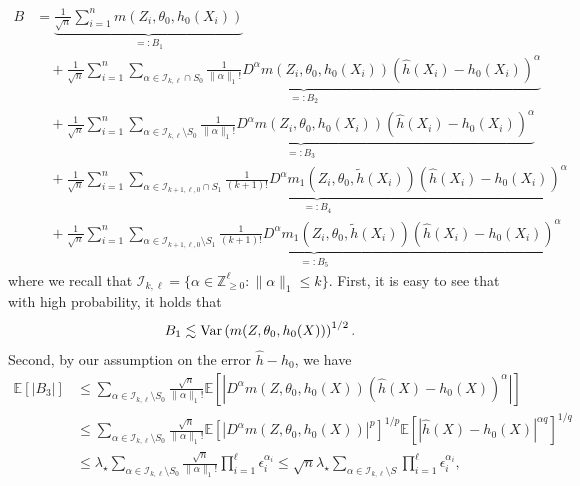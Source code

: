 \documentclass{article}
\def\eps{{\epsilon}}
\def\gI{{\mathcal{I}}}
\begin{document}
\begin{equation}
\label{eq:error-decomposition}
\begin{aligned}
B &=\underbrace{\frac{1}{\sqrt{n}} \sum_{i=1}^n m\left(Z_i, \theta_0, h_0\left(X_i\right)\right)}_{=:B_1}  \\
&\quad +\underbrace{\frac{1}{\sqrt{n}} \sum_{i=1}^n \sum_{\alpha \in \gI_{k,\ell} \cap S_0} \frac{1}{\|\alpha\|_{1}!} D^\alpha m\left(Z_i, \theta_0, h_0\left(X_i\right)\right)\left(\hat{h}\left(X_i\right)-h_0\left(X_i\right)\right)^\alpha}_{=:B_2} \\
&\quad +\underbrace{\frac{1}{\sqrt{n}} \sum_{i=1}^n \sum_{\alpha \in\gI_{k,\ell}\setminus S_0} \frac{1}{\|\alpha\|_{1}!} D^\alpha m\left(Z_i, \theta_0, h_0\left(X_i\right)\right)\left(\hat{h}\left(X_i\right)-h_0\left(X_i\right)\right)^\alpha}_{=:B_3} \\
&\quad +\underbrace{\frac{1}{\sqrt{n}} \sum_{i=1}^n \sum_{\alpha\in \gI_{k+1,\ell,0} \cap S_1} \frac{1}{(k+1)!}
D^\alpha m_1\left(Z_i, \theta_0, \tilde{h}\left(X_i\right)\right)\left(\hat{h}\left(X_i\right)-h_0\left(X_i\right)\right)^\alpha}_{=:B_4} \\
&\quad +\underbrace{\frac{1}{\sqrt{n}} \sum_{i=1}^n \sum_{\alpha\in \gI_{k+1,\ell,0} \setminus S_1} \frac{1}{(k+1)!}
D^\alpha m_1\left(Z_i, \theta_0, \tilde{h}\left(X_i\right)\right)\left(\hat{h}\left(X_i\right)-h_0\left(X_i\right)\right)^\alpha}_{=:B_5}
\end{aligned}
\end{equation}
where we recall that $\gI_{k,\ell} = \{\alpha\in\mathbb{Z}_{\geq 0}^{\ell}: \|\alpha\|_1\leq k\}$.
First, it is easy to see that with high probability, it holds that
\begin{equation}
    \notag
    B_1 \lesssim \mathrm{Var}\left(m(Z,\theta_0,h_0(X))\right)^{1/2}.
\end{equation}
Second, by our assumption on the error $\hat{h}-h_0$, we have
\begin{equation}
    \begin{aligned}
    \mathbb{E}\left[\left|B_3\right| \right] & \leq \sum_{\alpha \in\gI_{k,\ell}\setminus S_0} \frac{\sqrt{n}}{\|\alpha\|_{1}!} \mathbb{E}\left[\left|D^\alpha m\left(Z, \theta_0, h_0\left(X\right)\right)\left(\hat{h}\left(X\right)-h_0\left(X\right)\right)^\alpha\right|\right] \\
    & \leq \sum_{\alpha \in\gI_{k,\ell}\setminus S_0} \frac{\sqrt{n}}{\|\alpha\|_{1}!} \mathbb{E}\left[\left|D^\alpha m\left(Z, \theta_0, h_0\left(X\right)\right)\right|^p\right]^{1/p} \mathbb{E}\left[\left|\hat{h}\left(X\right)-h_0\left(X\right)\right|^{\alpha q}\right]^{1/q} \\
    & \leq \lambda_{\star} \sum_{\alpha \in\gI_{k,\ell}\setminus S_0} \frac{\sqrt{n}}{\|\alpha\|_{1}!}  \prod_{i=1}^{\ell}\eps_i^{\alpha_i} \leq \sqrt{n}\lambda_{\star}\sum_{\alpha \in\gI_{k,\ell}\setminus S} \prod_{i=1}^{\ell}\eps_i^{\alpha_i},
    \end{aligned}
\end{equation}
\end{document}
